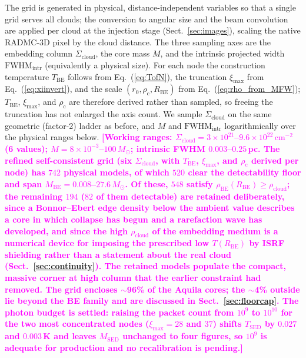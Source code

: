 \documentclass[11pt,a4paper]{article}
\newcommand{\note}[1]{\textcolor{magenta}{\textbf{[#1]}}}
\newcommand{\msun}{M_{\odot}}
\newcommand{\rhoc}{\rho_{\mathrm{c}}}
\newcommand{\rzero}{r_{0}}
\newcommand{\Rbe}{R_{\mathrm{BE}}}
\newcommand{\Tbe}{T_{\mathrm{BE}}}
\newcommand{\ximax}{\xi_{\mathrm{max}}}
\newcommand{\Scloud}{\Sigma_{\mathrm{cloud}}}
\newcommand{\rhocloud}{\rho_{\mathrm{cloud}}}
\begin{document}
The grid is generated in physical, distance-independent variables so that a
single grid serves all clouds; the conversion to angular size and the beam
convolution are applied per cloud at the injection stage
(Sect.~\ref{sec:images}), scaling the native RADMC-3D pixel by the cloud
distance. The three sampling axes are the embedding column $\Scloud$, the core
mass $M$, and the intrinsic projected width $\mathrm{FWHM}_{\mathrm{intr}}$
(equivalently a physical size). For each node the construction temperature
$\Tbe$ follows from Eq.~(\ref{eq:TofN}), the truncation $\ximax$ from
Eq.~(\ref{eq:xiinvert}), and the scale $(\rzero,\rhoc,\Rbe)$ from
Eq.~(\ref{eq:rho_from_MFW}); $\Tbe$, $\ximax$, and $\rhoc$ are therefore derived
rather than sampled, so freeing the truncation has not enlarged the axis count.
We sample $\Scloud$ on the same geometric (factor-2) ladder as before, and $M$
and $\mathrm{FWHM}_{\mathrm{intr}}$ logarithmically over the physical ranges
below.
\note{Working ranges: $\Scloud=3\times10^{21}$--$9.6\times10^{22}\,
\mathrm{cm^{-2}}$ (6 values); $M=8\times10^{-3}$--$100\,\msun$; intrinsic FWHM
$0.003$--$0.25$\,pc. The refined self-consistent grid (six $\Scloud$, with
$\Tbe$, $\ximax$, and $\rhoc$ derived per node) has $742$ physical models, of
which $520$ clear the detectability floor and span
$M_{\mathrm{BE}}=0.008$--$27.6\,\msun$. Of these, $548$ satisfy
$\rho_{\mathrm{BE}}(\Rbe)\ge\rhocloud$; the remaining $194$ ($82$ of them
detectable) are retained deliberately, since a Bonnor--Ebert edge density below
the ambient value describes a core in which collapse has begun and a
rarefaction wave has developed, and since the high $\rhocloud$ of the embedding
medium is a numerical device for imposing the prescribed low $T(\Rbe)$ by ISRF
shielding rather than a statement about the real cloud
(Sect.~\ref{sec:continuity}). The retained models populate the compact, massive
corner at high column that the earlier constraint had removed. The grid
encloses $\sim$96\% of the Aquila cores; the $\sim$4\% outside lie beyond the
BE family and are discussed in Sect.~\ref{sec:floorcap}. The photon budget is
settled: raising the packet count from $10^{9}$ to $10^{10}$ for the two most
concentrated nodes ($\ximax=28$ and $37$) shifts $T_{\mathrm{SED}}$ by $0.027$
and $0.003$\,K and leaves $M_{\mathrm{SED}}$ unchanged to four figures, so
$10^{9}$ is adequate for production and no recalibration is pending.}
\end{document}
